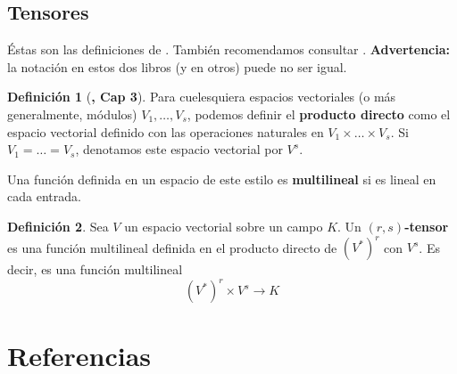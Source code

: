 \documentclass[spanish]{book}
\theoremstyle{definition}
\newtheorem*{defn}{Definición}
\begin{document}
	\section{Tensores}
	Éstas son las definiciones de \cite{ONeill}. También recomendamos consultar \cite{Palmas}. \textbf{Advertencia:} la notación en estos dos libros (y en otros) puede no ser igual.
	\begin{defn}[\cite{ONeill}\textbf{, Cap 3}]
		Para cuelesquiera espacios vectoriales (o más generalmente, módulos) $V_1,\ldots,V_s$, podemos definir el \textbf{producto directo} como el espacio vectorial definido con las operaciones naturales en $V_1\times\ldots\times V_s$. Si $V_1=\ldots=V_s$, denotamos este espacio vectorial por $V^s$.
		
		Una función definida en un espacio de este estilo es \textbf{multilineal} si es lineal en cada entrada.
	\end{defn}
	\begin{defn}
		Sea $V$ un espacio vectorial sobre un campo $K$. Un \textbf{$(r,s)$-tensor} es una función multilineal definida en el producto directo de $(V^*)^r$ con $V^s$. Es decir, es una función multilineal
		\[(V^*)^r\times V^s\to K\]
	\end{defn}
	
	\chapter{Referencias}
	\printbibliography[heading=none]
\end{document}
